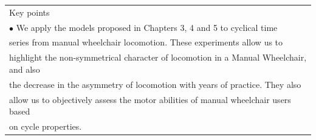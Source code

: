 \begin{table}[ht]
\centering
\begin{tabular}{|l|}

\hline
\rowcolor{LavenderBlush}
Key points\\
$\bullet$ We apply the models proposed in Chapters 3, 4 and 5 to cyclical time \\ series from manual wheelchair locomotion. These experiments allow us to \\ highlight the non-symmetrical character of locomotion in a Manual Wheelchair, and also \\ the decrease in the asymmetry of locomotion with years of practice. They also \\ allow us to objectively assess the motor abilities of manual wheelchair users based \\ on cycle properties.\\


 
\hline
\end{tabular}
\end{table}
